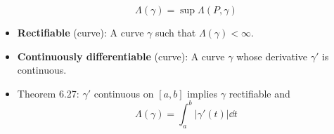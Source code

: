 \documentclass[../../notes.tex]{subfiles}
\begin{document}
\begin{itemize}
    \begin{equation*}
        \Lambda(\gamma) = \sup\Lambda(P,\gamma)
    \end{equation*}
    \item \textbf{Rectifiable} (curve): A curve $\gamma$ such that $\Lambda(\gamma)<\infty$.
    \item \textbf{Continuously differentiable} (curve): A curve $\gamma$ whose derivative $\gamma'$ is continuous.
    \item Theorem 6.27: $\gamma'$ continuous on $[a,b]$ implies $\gamma$ rectifiable and
    \begin{equation*}
        \Lambda(\gamma) = \int_a^b|\gamma'(t)|\dd{t}
    \end{equation*}
\end{itemize}
\end{document}
